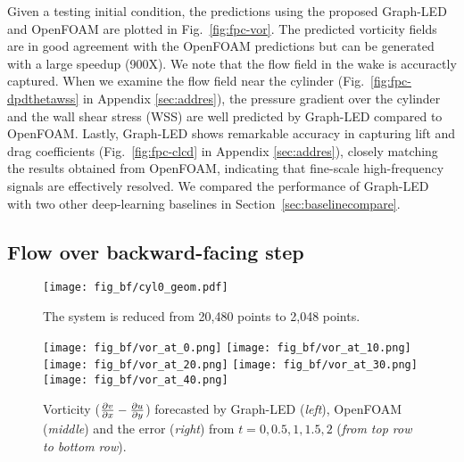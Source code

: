 \documentclass{article}
\begin{document}
Given a testing initial condition, the predictions using the proposed Graph-LED and OpenFOAM are plotted in Fig.~\ref{fig:fpc-vor}. The predicted vorticity fields are in good agreement with the OpenFOAM predictions { but can be generated with a large speedup (900X).} We note that the flow field in the wake is accuractly captured. When we examine the flow field near the cylinder (Fig.~\ref{fig:fpc-dpdthetawss} in Appendix \ref{sec:addres}), the pressure gradient over the cylinder and the wall shear stress (WSS) are well predicted by Graph-LED compared to OpenFOAM. Lastly, Graph-LED shows remarkable accuracy in capturing lift and drag coefficients (Fig.~\ref{fig:fpc-clcd} in Appendix \ref{sec:addres}), closely matching the results obtained from OpenFOAM, indicating that fine-scale high-frequency signals are effectively resolved. { We compared the performance of Graph-LED with two other deep-learning baselines in Section~\ref{sec:baselinecompare}.}



\subsection{Flow over backward-facing step}

\begin{figure}[htp]
    \hfill
    \texttt{[image: fig\_bf/cyl0\_geom.pdf]}
    \caption{The system is reduced from 20,480 points to 2,048 points.}
    \label{fig:bfs-dom}
\end{figure}


\begin{figure}[htp]
    \centering
    \texttt{[image: fig\_bf/vor\_at\_0.png]}
    \texttt{[image: fig\_bf/vor\_at\_10.png]}
    \texttt{[image: fig\_bf/vor\_at\_20.png]}
    \texttt{[image: fig\_bf/vor\_at\_30.png]}
    \texttt{[image: fig\_bf/vor\_at\_40.png]}
    \caption{Vorticity ($\frac{\partial v}{\partial x} - \frac{\partial u}{\partial y}$) forecasted by Graph-LED (\textit{left}), OpenFOAM (\textit{middle}) and the error (\textit{right}) from $t = 0, 0.5, 1, 1.5, 2$ (\textit{from top row to bottom row}). }
    \label{fig:bf-vor}
\end{figure}
\end{document}
